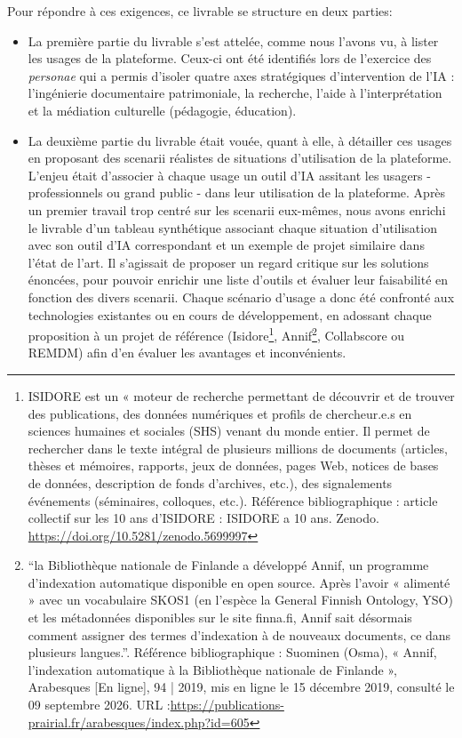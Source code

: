 Pour répondre à ces exigences, ce livrable se structure en deux parties: 
\begin{itemize}
	\item La première partie du livrable s'est attelée, comme nous l'avons vu, à lister les usages de la plateforme. Ceux-ci ont été identifiés lors de l'exercice des \textit{personae} qui a permis d'isoler quatre axes stratégiques d'intervention de l'IA : l'ingénierie documentaire patrimoniale, la recherche, l'aide à l'interprétation et la médiation culturelle (pédagogie, éducation).
	\item La deuxième partie du livrable était vouée, quant à elle, à détailler ces usages en proposant des scenarii réalistes de situations d'utilisation de la plateforme. L'enjeu était d'associer à chaque usage un outil d'IA assitant les usagers - professionnels ou grand public - dans leur utilisation de la plateforme.
	Après un premier travail trop centré sur les scenarii eux-mêmes, nous avons enrichi le livrable d'un tableau synthétique associant chaque situation d'utilisation avec son outil d'IA correspondant et un exemple de projet similaire dans l'état de l'art. Il s'agissait de proposer un regard critique sur les solutions énoncées, pour pouvoir enrichir une liste d'outils et évaluer leur faisabilité en fonction des divers scenarii. Chaque scénario d'usage a donc été confronté aux technologies existantes ou en cours de développement, en adossant chaque proposition à un projet de référence (Isidore\footnote{ISIDORE est un « moteur de recherche permettant de découvrir et de trouver des publications, des données numériques et profils de chercheur.e.s en sciences humaines et sociales (SHS) venant du monde entier. Il permet de rechercher dans le texte intégral de plusieurs millions de documents (articles, thèses et mémoires, rapports, jeux de données, pages Web, notices de bases de données, description de fonds d’archives, etc.), des signalements
		événements (séminaires, colloques, etc.). Référence bibliographique : article collectif sur les 10 ans d'ISIDORE : ISIDORE a 10 ans. Zenodo. \url{https://doi.org/10.5281/zenodo.5699997}}, Annif\footnote{ \enquote{la Bibliothèque nationale de Finlande a développé Annif, un programme d’indexation automatique disponible en open source. Après l’avoir « alimenté » avec un vocabulaire SKOS1 (en l’espèce la General Finnish Ontology, YSO) et les métadonnées disponibles sur le site finna.fi, Annif sait désormais comment assigner des termes d’indexation à de nouveaux documents, ce dans plusieurs langues.}. Référence bibliographique : Suominen (Osma), « Annif, l’indexation automatique à la Bibliothèque nationale de Finlande », Arabesques [En ligne], 94 | 2019, mis en ligne le 15 décembre 2019, consulté le 09 septembre 2026. URL :\url{https://publications-prairial.fr/arabesques/index.php?id=605}}, Collabscore ou REMDM) afin d'en évaluer les avantages et inconvénients.
\end{itemize}

